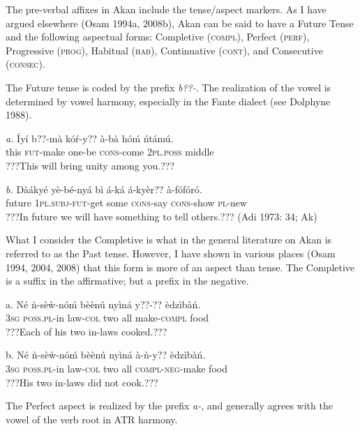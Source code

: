 \documentclass[output=paper]{langsci/langscibook}
\begin{document}
The pre-verbal affixes in Akan include the tense/aspect markers. As I have argued elsewhere (Osam 1994a, 2008b), Akan can be said to have a Future Tense and the following aspectual forms: Completive (\textsc{compl}), Perfect (\textsc{perf}), Progressive (\textsc{prog}), Habitual (\textsc{hab}), Continuative (\textsc{cont}), and Consecutive (\textsc{consec}).

The Future tense is coded by the prefix \emph{b??-}. The realization of the vowel is determined by vowel harmony, especially in the Fante dialect (see Dolphyne 1988).

\ea
\gll \emph{a.}  \'{I}yí  b??-mà    kó\'{r}-y??    à-bà    hóḿ    ńtámú.\\
       this  \textsc{fut}{}-make  one-be    \textsc{cons}{}-come  \textsc{2pl.poss}  middle\\
\glt ???This will bring unity among you.??? \citep[79]{Krampah1970}
\z

\ea
\gll \emph{b.  }Dàákyé yè-bé-nyá    bì  á-ká    á-kyèr??    à-fófóró.  \\
       future   \textsc{1pl.subj}{}-\textsc{fut}{}-get  some  \textsc{cons}{}-say\textsc{   cons}{}-show  \textsc{pl}{}-new\\
\glt    ???In future we will have something to tell others.??? (Adi 1973: 34; Ak)
\z

What I consider the Completive is what in the general literature on Akan is referred to as the Past tense. However, I have shown in various places (Osam 1994, 2004, 2008) that this form is more of an aspect than tense. The Completive is a suffix in the affirmative; but a prefix in the negative.  

\ea
\gll \textup{a.}  Né  ǹ-sèẁ-nóḿ    bèènú   nyìná  y??-??    èdzìbàń.\\
     \textsc{ }\textsc{\textup{3sg}}   \textsc{poss.pl}{}-in law-\textsc{col}  two   all  make-\textsc{compl}  food\\
\glt ???Each of his two in-laws cooked.??? \citep[57]{Krampah1970}
\z

\ea
\gll \textup{b.  }Né  ǹ-sèẁ-nóḿ    bèènú   nyìná  à-ǹ-y??      èdzìbàń.\\
     \textsc{  3sg}   \textsc{poss.pl}{}-in law-\textsc{col}  two  all  \textsc{compl-neg}{}-make  food\\
\glt ???His two in-laws did not cook.???
\z

The Perfect aspect is realized by the prefix \emph{a-}, and generally agrees with the vowel of the verb root in ATR harmony.
\end{document}

